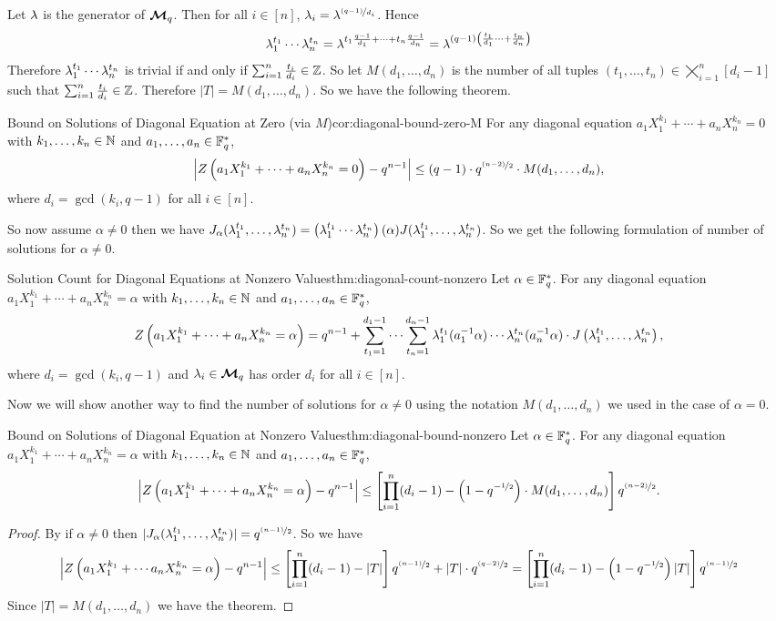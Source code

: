 Let $\lambda$ is the generator of $\boldsymbol{\mathcal{M}}_q$. Then for all $i\in[n]$, $\lambda_i=\lambda^{\nicefrac{(q-1)}{d_i}}$. Hence $$\lambda_1^{t_1}\cdots \lambda_n^{t_n}=\lambda^{t_1\frac{q-1}{d_1}+\cdots+ t_n\frac{q-1}{d_n}}=\lambda^{(q-1)\left(\frac{t_1}{d_1}\cdots+\frac{t_n}{d_n}\right)}$$ Therefore $\lambda_1^{t_1}\cdots \lambda_n^{t_n}$ is trivial if and only if $\sum_{i=1}^n \frac{t_i}{d_i}\in\mathbb{Z}$. So let $M(d_1,\dots, d_n)$ is the number of all tuples $(t_1,\dots,t_n)\in\bigtimes_{i=1}^n [d_i-1]$ such that $\sum_{i=1}^n \frac{t_i}{d_i}\in\mathbb{Z}$. Therefore $|T|=M(d_1,\dots, d_n)$. So we have the following theorem. 
\begin{corolary}{Bound on Solutions of Diagonal Equation at Zero (via $M$)}{cor:diagonal-bound-zero-M}
  For any diagonal equation $a_1X_1^{k_1}+\cdots+a_nX_n^{k_n}=0$ with $k_1,\dots,k_n\in\mathbb{N}$ and $a_1,\dots,a_n\in\mathbb{F}_q^*$,
  $$\left|Z\left(a_1X_1^{k_1}+\cdots+a_nX_n^{k_n}=0\right)-q^{n-1}\right|\leq (q-1)\cdot q^{\nicefrac{(n-2)}{2}}\cdot M(d_1,\dots, d_n),$$where $d_i=\gcd(k_i,q-1)$ for all $i\in[n]$.
\end{corolary}

So now assume $\alpha\neq 0$ then we have $J_{\alpha}(\lambda_1^{t_1},\dots, \lambda_n^{t_n})=\left(\lambda_1^{t_1}\cdots\lambda_n^{t_n}\right)(\alpha)J(\lambda_1^{t_1},\dots, \lambda_n^{t_n})$. So we get the following formulation of number of solutions for $\alpha\neq 0$. 
\begin{Theorem}{Solution Count for Diagonal Equations at Nonzero Values}{thm:diagonal-count-nonzero}
  Let $\alpha\in\mathbb{F}_q^*$. For any diagonal equation $a_1X_1^{k_1}+\cdots+a_nX_n^{k_n}=\alpha$ with $k_1,\dots,k_n\in\mathbb{N}$ and $a_1,\dots,a_n\in\mathbb{F}_q^*$,
  $$Z\left(a_1X_1^{k_1}+\cdots+a_nX_n^{k_n}=\alpha\right)=q^{n-1}+\sum_{t_1=1}^{d_1-1}\cdots \sum_{t_n=1}^{d_n-1}\lambda_1^{t_1}(a_1^{-1}\alpha)\cdots\lambda_n^{t_n}(a_n^{-1}\alpha) \cdot J\left(\lambda_1^{t_1},\dots, \lambda_n^{t_n}\right),$$where $d_i=\gcd(k_i,q-1)$ and $\lambda_i\in\boldsymbol{\mathcal{M}}_q$ has order $d_i$ for all $i\in[n]$.
\end{Theorem}

Now we will show another way to find the number of solutions for $\alpha\neq 0$ using the notation $M(d_1,\dots, d_n)$ we used in the case of $\alpha=0$. 
\begin{Theorem}{Bound on Solutions of Diagonal Equation at Nonzero Values}{thm:diagonal-bound-nonzero}
  Let $\alpha\in\mathbb{F}_q^*$. For any diagonal equation $a_1X_1^{k_1}+\cdots+a_nX_n^{k_n}=\alpha$ with $k_1,\dots,k_n\in\mathbb{N}$ and $a_1,\dots,a_n\in\mathbb{F}_q^*$,
  $$\left|Z\left(a_1X_1^{k_1}+\cdots+a_nX_n^{k_n}=\alpha\right)-q^{n-1}\right| \leq \left[\prod_{i=1}^n(d_i-1) - \left(1-q^{-\nicefrac12}\right)\cdot M(d_1,\dots, d_n)\right]q^{\nicefrac{(n-2)}{2}}.$$
\end{Theorem}
\begin{proof}
  By \JacobiCompletethm[(iii-iv)] if $\alpha\neq 0$ then $|J_{\alpha}(\lambda_1^{t_1},\dots, \lambda_n^{t_n})|=q^{\nicefrac{(n-1)}{2}}$. So we have $$\left|Z\left(a_1X_1^{k_1}+\cdots a_nX_n^{k_n}=\alpha\right)-q^{n-1}\right|\leq \left[\prod_{i=1}^n(d_i-1)-|T|\right]q^{\nicefrac{(n-1)}{2}}+|T|\cdot q^{\nicefrac{(q-2)}{2}}=\left[\prod_{i=1}^n (d_i-1)-\left(1-q^{-\nicefrac12}\right)|T|\right]q^{\nicefrac{(n-1)}{2}}$$Since $|T|=M(d_1,\dots, d_n)$ we have the theorem. 
\end{proof}

